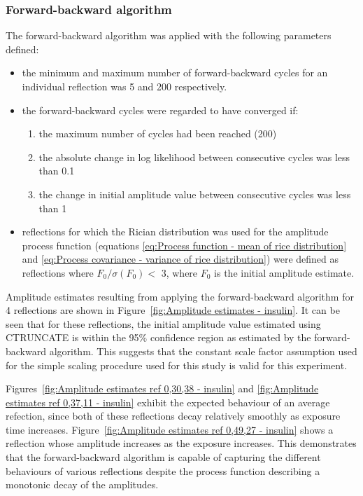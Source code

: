 \subsubsection{Forward-backward algorithm}
\label{subs:Forward-backward algorithm - insulin}
The forward-backward algorithm was applied with the following parameters defined:
\begin{itemize}
    \item the minimum and maximum number of forward-backward cycles for an individual reflection was 5 and 200 respectively.
    \item the forward-backward cycles were regarded to have converged if:
    \begin{enumerate}
        \item the maximum number of cycles had been reached (200)
        \item the absolute change in log likelihood between consecutive cycles was less than 0.1
        \item the change in initial amplitude value between consecutive cycles was less than 1
    \end{enumerate}
    \item reflections for which the Rician distribution was used for the amplitude process function (equations \ref{eq:Process function - mean of rice distribution} and \ref{eq:Process covariance - variance of rice distribution}) were defined as reflections where $F_0/\sigma(F_0) <$ 3, where $F_0$ is the initial amplitude estimate.
\end{itemize}
Amplitude estimates resulting from applying the forward-backward algorithm for 4 reflections are shown in Figure~\ref{fig:Amplitude estimates - insulin}.
It can be seen that for these reflections, the initial amplitude value estimated using CTRUNCATE is within the 95\% confidence region as estimated by the forward-backward algorithm.
This suggests that the constant scale factor assumption used for the simple scaling procedure used for this study is valid for this experiment.

Figures~\ref{fig:Amplitude estimates ref 0,30,38 - insulin} and \ref{fig:Amplitude estimates ref 0,37,11 - insulin} exhibit the expected behaviour of an average refection, since both of these reflections decay relatively smoothly as exposure time increases.
Figure~\ref{fig:Amplitude estimates ref 0,49,27 - insulin} shows a reflection whose amplitude increases as the exposure increases.
This demonstrates that the forward-backward algorithm is capable of capturing the different behaviours of various reflections despite the process function describing a monotonic decay of the amplitudes.

